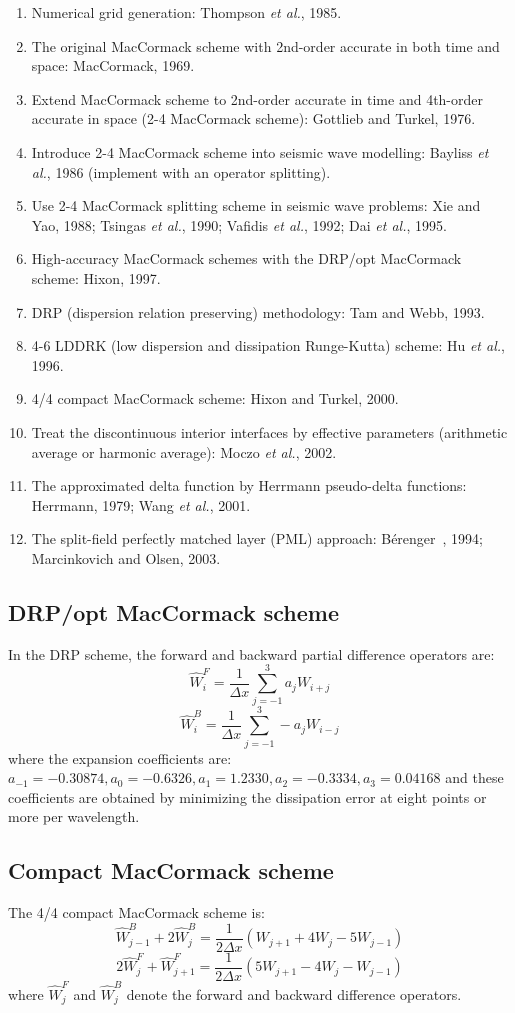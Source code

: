 \documentclass{article}
\newcommand{\Berenger}{B\'{e}renger~}
\newcommand{\etal}{\textit{et al.}}
\begin{document}
\begin{enumerate}[\hspace{10mm}*]
  \item Numerical grid generation: Thompson \etal, 1985.
  \item The original MacCormack scheme with 2nd-order accurate in both time and space: MacCormack, 1969.
  \item Extend MacCormack scheme to 2nd-order accurate in time and 4th-order accurate in space (2-4 MacCormack scheme): Gottlieb and Turkel, 1976.
  \item Introduce 2-4 MacCormack scheme into seismic wave modelling: Bayliss \etal, 1986 (implement with an operator splitting).
  \item Use 2-4 MacCormack splitting scheme in seismic wave problems: Xie and Yao, 1988; Tsingas \etal, 1990; Vafidis \etal, 1992; Dai \etal, 1995.
  \item High-accuracy MacCormack schemes with the DRP/opt MacCormack scheme: Hixon, 1997.
  \item DRP (dispersion relation preserving) methodology: Tam and Webb, 1993.
  \item 4-6 LDDRK (low dispersion and dissipation Runge-Kutta) scheme: Hu \etal, 1996.
  \item 4/4 compact MacCormack scheme: Hixon and Turkel, 2000.
  \item Treat the discontinuous interior interfaces by effective parameters (arithmetic average or harmonic average): Moczo \etal, 2002.
  \item The approximated delta function by Herrmann pseudo-delta functions: Herrmann, 1979; Wang \etal, 2001.
  \item The split-field perfectly matched layer (PML) approach: \Berenger, 1994; Marcinkovich and Olsen, 2003.
\end{enumerate}\par
\subsection{DRP/opt MacCormack scheme}
In the DRP scheme, the forward and backward partial difference operators are:
\[ \hat W_i^F=\frac{1}{\Delta x}\sum_{j=-1}^3a_jW_{i+j} \]
\[ \hat W_i^B=\frac{1}{\Delta x}\sum_{j=-1}^3-a_jW_{i-j} \]
where the expansion coefficients are: $a_{-1}=-0.30874,a_0=-0.6326,a_1=1.2330,a_2=-0.3334,a_3=0.04168$ and these coefficients are obtained by minimizing the dissipation error at eight points or more per wavelength.\par
\subsection{Compact MacCormack scheme}
The 4/4 compact MacCormack scheme is:
\[ \hat W_{j-1}^B+2\hat W_j^B=\frac{1}{2\Delta x}(W_{j+1}+4W_j-5W_{j-1}) \]
\[ 2\hat W_j^F+\hat W_{j+1}^F=\frac{1}{2\Delta x}(5W_{j+1}-4W_j-W_{j-1}) \]
where $\hat W_j^F$ and $\hat W_j^B$ denote the forward and backward difference operators.\par
\end{document}

